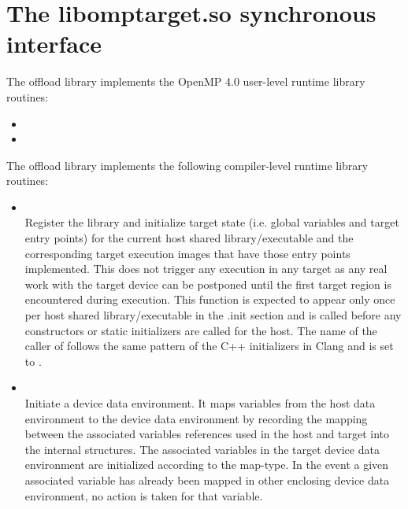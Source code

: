 \section{The libomptarget.so synchronous interface}\label{sc:LibomptargetSync}

The offload library implements the OpenMP 4.0 user-level runtime library routines:
\begin{itemize}
  \item {}

  \item {}
\end{itemize}

The offload library implements the following compiler-level runtime library routines:
\begin{itemize}

  \item {}\\

    Register the \libomptarget{} library and initialize target state (i.e. global variables and target entry points) for the current host shared library/executable and the corresponding target execution images that have those entry points implemented. This does not trigger any execution in any target as any real work with the target device can be postponed until the first target region is encountered during execution. This function is expected to appear only once per host shared library/executable in the .init section and is called before any constructors or static initializers are called for the host. The name of the caller of  follows the same pattern of the C++ initializers in Clang and is set to . 

  \item {}\\

    Initiate a device data environment. It maps variables from the host data environment to the device data environment by recording the mapping between the associated variables references used in the host and target into the \libomptarget{} internal structures. The associated variables in the target device data environment are initialized according to the map-type. In the event a given associated variable has already been mapped in other enclosing device data environment, no action is taken for that variable.


\end{itemize}
